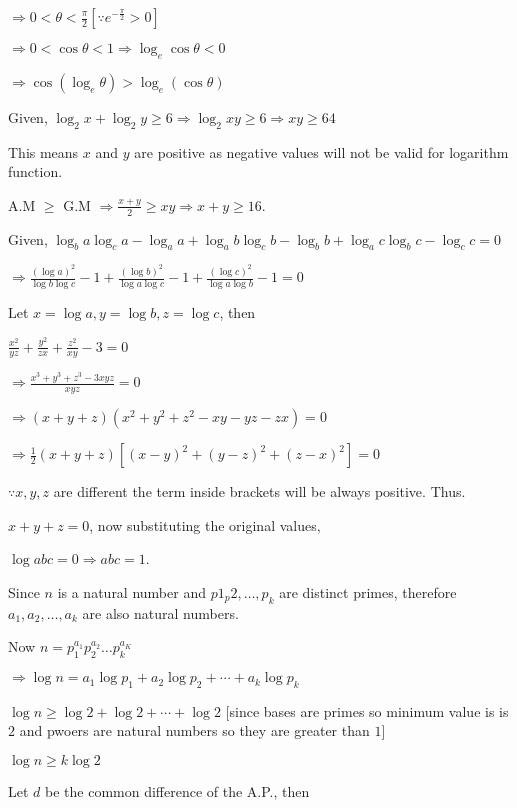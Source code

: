   $\Rightarrow 0 < \theta <\frac{\pi}{2} [\because e^{-\tfrac{\pi}{2}} > 0]$

  $\Rightarrow 0 < \cos\theta < 1 \Rightarrow \log_e\cos\theta < 0$

  $\Rightarrow \cos(\log_e\theta) > \log_e(\cos\theta)$
\item Given, $\log_2x + \log_2y \geq 6\Rightarrow \log_2xy \geq 6 \Rightarrow xy \geq 64$

  This means $x$ and $y$ are positive as negative values will not be valid for logarithm function.

  A.M $\geq$ G.M $\Rightarrow \frac{x + y}{2} \geq xy \Rightarrow x + y \geq 16$.
\item Given, $\log_ba\log_ca - \log_aa + \log_ab\log_cb - \log_bb + \log_ac\log_bc - \log_cc = 0$

  $\Rightarrow \frac{(\log a)^2}{\log b\log c} - 1 + \frac{(\log b)^2}{\log a\log c} - 1 + \frac{(\log c)^2}{\log a\log b} - 1 =0$

  Let $x = \log a, y = \log b, z = \log c$, then

  $\frac{x^2}{yz} + \frac{y^2}{zx} + \frac{z^2}{xy} - 3 = 0$

  $\Rightarrow \frac{x^3 + y^3 + z^3 - 3xyz}{xyz} = 0$

  $\Rightarrow (x + y + z)(x^2 + y^2 + z^2 - xy - yz - zx) = 0$

  $\Rightarrow \frac{1}{2}(x + y + z)[(x - y)^2 + (y - z)^2 + (z - x)^2] = 0$

  $\because x, y, z$ are different the term inside brackets will be always positive. Thus.

  $x + y + z = 0$, now substituting the original values,

  $\log abc = 0 \Rightarrow abc = 1$.
\item Since $n$ is a natural number and $p1_p2, \ldots, p_k$ are distinct primes, therefore $a_1, a_2, \ldots, a_k$ are also natural
  numbers.

  Now $n = p_1^{a_1}p_2^{a_2}\ldots p_k^{a_K}$

  $\Rightarrow \log n = a_1\log p_1 + a_2\log p_2 + \cdots + a_k\log p_k$

  $\log n\geq \log 2 + \log 2 + \cdots + \log 2$ [since bases are primes so minimum value is is $2$ and pwoers are natural
    numbers so they are greater than $1$]

  $\log n \geq k\log 2$
\item Let $d$ be the common difference of the A.P., then

